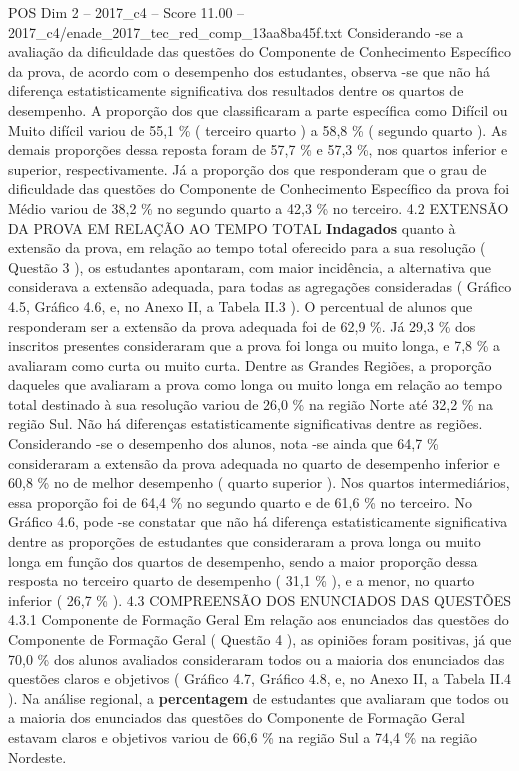 \begin{textsample}{POS Dim 2 – 2017\_c4 – Score 11.00 – 2017\_c4/enade\_2017\_tec\_red\_comp\_13aa8ba45f.txt}
Considerando -se a avaliação da dificuldade das questões do Componente de Conhecimento Específico da prova, de acordo com o desempenho dos estudantes, observa -se que não há diferença estatisticamente significativa dos resultados dentre os quartos de desempenho.
A proporção dos que classificaram a parte específica como Difícil ou Muito difícil variou de 55,1 \% ( terceiro quarto ) a 58,8 \% ( segundo quarto ).
As demais proporções dessa reposta foram de 57,7 \% e 57,3 \%, nos quartos inferior e superior, respectivamente.
Já a proporção dos que responderam que o grau de dificuldade das questões do Componente de Conhecimento Específico da prova foi Médio variou de 38,2 \% no segundo quarto a 42,3 \% no terceiro. 4.2 EXTENSÃO DA PROVA EM RELAÇÃO AO TEMPO TOTAL \textbf{Indagados} quanto à extensão da prova, em relação ao tempo total oferecido para a sua resolução ( Questão 3 ), os estudantes apontaram, com maior incidência, a alternativa que considerava a extensão adequada, para todas as agregações consideradas ( Gráfico 4.5, Gráfico 4.6, e, no Anexo II, a Tabela II.3 ).
O percentual de alunos que responderam ser a extensão da prova adequada foi de 62,9 \%.
Já 29,3 \% dos inscritos presentes consideraram que a prova foi longa ou muito longa, e 7,8 \% a avaliaram como curta ou muito curta.
Dentre as Grandes Regiões, a proporção daqueles que avaliaram a prova como longa ou muito longa em relação ao tempo total destinado à sua resolução variou de 26,0 \% na região Norte até 32,2 \% na região Sul.
Não há diferenças estatisticamente significativas dentre as regiões.
Considerando -se o desempenho dos alunos, nota -se ainda que 64,7 \% consideraram a extensão da prova adequada no quarto de desempenho inferior e 60,8 \% no de melhor desempenho ( quarto superior ).
Nos quartos intermediários, essa proporção foi de 64,4 \% no segundo quarto e de 61,6 \% no terceiro.
No Gráfico 4.6, pode -se constatar que não há diferença estatisticamente significativa dentre as proporções de estudantes que consideraram a prova longa ou muito longa em função dos quartos de desempenho, sendo a maior proporção dessa resposta no terceiro quarto de desempenho ( 31,1 \% ), e a menor, no quarto inferior ( 26,7 \% ). 4.3 COMPREENSÃO DOS ENUNCIADOS DAS QUESTÕES 4.3.1 Componente de Formação Geral Em relação aos enunciados das questões do Componente de Formação Geral ( Questão 4 ), as opiniões foram positivas, já que 70,0 \% dos alunos avaliados consideraram todos ou a maioria dos enunciados das questões claros e objetivos ( Gráfico 4.7, Gráfico 4.8, e, no Anexo II, a Tabela II.4 ).
Na análise regional, a \textbf{percentagem} de estudantes que avaliaram que todos ou a maioria dos enunciados das questões do Componente de Formação Geral estavam claros e objetivos variou de 66,6 \% na região Sul a 74,4 \% na região Nordeste.

\end{textsample}
